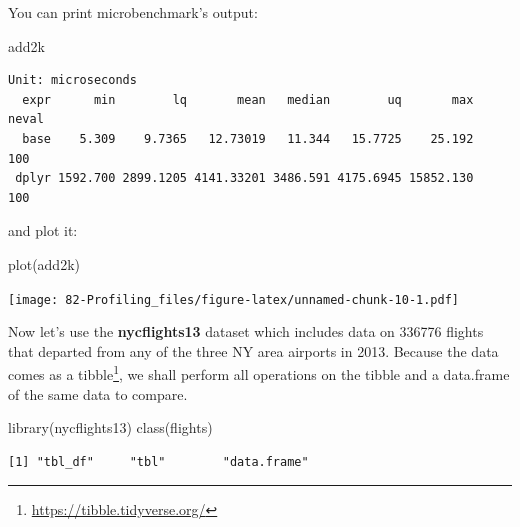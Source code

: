 \documentclass[
]{book}
\newenvironment{Shaded}{\begin{snugshade}}{\end{snugshade}}
\newcommand{\AttributeTok}[1]{\textcolor[rgb]{0.77,0.63,0.00}{#1}}
\newcommand{\FunctionTok}[1]{\textcolor[rgb]{0.00,0.00,0.00}{#1}}
\newcommand{\NormalTok}[1]{#1}
\newcommand{\OtherTok}[1]{\textcolor[rgb]{0.56,0.35,0.01}{#1}}
\newcommand{\SpecialCharTok}[1]{\textcolor[rgb]{0.00,0.00,0.00}{#1}}
\DeclareRobustCommand{\href}[2]{#2\footnote{\url{#1}}}
\begin{document}
\begin{Shaded}
\end{Shaded}

You can print microbenchmark's output:

\begin{Shaded}
\begin{Highlighting}[]
\NormalTok{add2k}
\end{Highlighting}
\end{Shaded}

\begin{verbatim}
Unit: microseconds
  expr      min        lq       mean   median        uq       max neval
  base    5.309    9.7365   12.73019   11.344   15.7725    25.192   100
 dplyr 1592.700 2899.1205 4141.33201 3486.591 4175.6945 15852.130   100
\end{verbatim}

and plot it:

\begin{Shaded}
\begin{Highlighting}[]
\FunctionTok{plot}\NormalTok{(add2k)}
\end{Highlighting}
\end{Shaded}

\texttt{[image: 82-Profiling\_files/figure-latex/unnamed-chunk-10-1.pdf]}

Now let's use the \textbf{nycflights13} dataset which includes data on 336776 flights that departed from any of the three NY area airports in 2013. Because the data comes as a \href{https://tibble.tidyverse.org/}{tibble}, we shall perform all operations on the tibble and a data.frame of the same data to compare.

\begin{Shaded}
\begin{Highlighting}[]
\FunctionTok{library}\NormalTok{(nycflights13)}
\FunctionTok{class}\NormalTok{(flights)}
\end{Highlighting}
\end{Shaded}

\begin{verbatim}
[1] "tbl_df"     "tbl"        "data.frame"
\end{verbatim}
\end{document}
